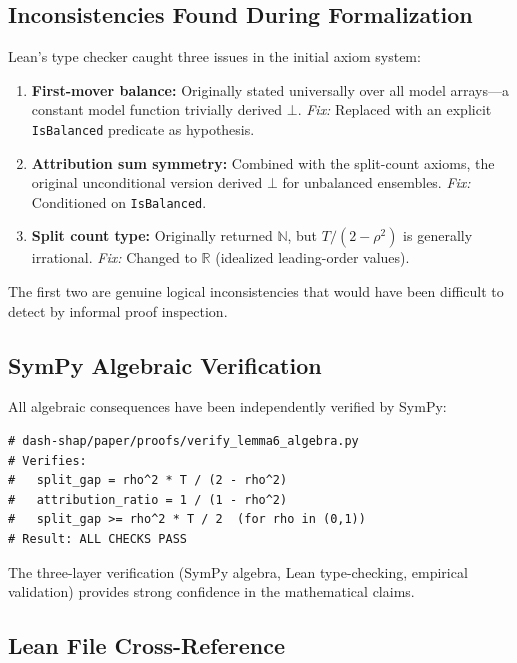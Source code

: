 \documentclass{jmlr}
\begin{document}
\subsection{Inconsistencies Found During Formalization}

Lean's type checker caught three issues in the initial axiom system:

\begin{enumerate}
\item \textbf{First-mover balance:} Originally stated universally over all model arrays---a constant model function trivially derived $\bot$. \emph{Fix:} Replaced with an explicit \texttt{IsBalanced} predicate as hypothesis.

\item \textbf{Attribution sum symmetry:} Combined with the split-count axioms, the original unconditional version derived $\bot$ for unbalanced ensembles. \emph{Fix:} Conditioned on \texttt{IsBalanced}.

\item \textbf{Split count type:} Originally returned $\mathbb{N}$, but $T/(2-\rho^2)$ is generally irrational. \emph{Fix:} Changed to $\mathbb{R}$ (idealized leading-order values).
\end{enumerate}

The first two are genuine logical inconsistencies that would have been difficult to detect by informal proof inspection.

\subsection{SymPy Algebraic Verification}

All algebraic consequences have been independently verified by SymPy:

\begin{verbatim}
# dash-shap/paper/proofs/verify_lemma6_algebra.py
# Verifies:
#   split_gap = rho^2 * T / (2 - rho^2)
#   attribution_ratio = 1 / (1 - rho^2)
#   split_gap >= rho^2 * T / 2  (for rho in (0,1))
# Result: ALL CHECKS PASS
\end{verbatim}

The three-layer verification (SymPy algebra, Lean type-checking, empirical validation) provides strong confidence in the mathematical claims.

\subsection{Lean File Cross-Reference}
\end{document}
